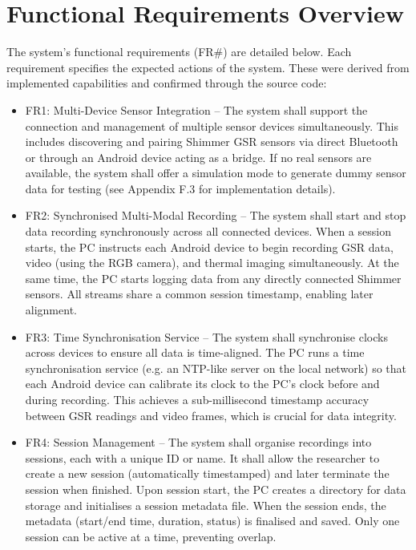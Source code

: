\section{Functional Requirements Overview}
The system's functional requirements (FR\#) are detailed below. Each requirement specifies the expected actions of the system. These were derived from implemented capabilities and confirmed through the source code:

\begin{itemize}
    \item FR1: Multi-Device Sensor Integration -- The system shall support the connection and management of multiple sensor devices simultaneously. This includes discovering and pairing Shimmer GSR sensors via direct Bluetooth or through an Android device acting as a bridge. If no real sensors are available, the system shall offer a simulation mode to generate dummy sensor data for testing (see Appendix F.3 for implementation details).

    \item FR2: Synchronised Multi-Modal Recording -- The system shall start and stop data recording synchronously across all connected devices. When a session starts, the PC instructs each Android device to begin recording GSR data, video (using the RGB camera), and thermal imaging simultaneously. At the same time, the PC starts logging data from any directly connected Shimmer sensors. All streams share a common session timestamp, enabling later alignment.

    \item FR3: Time Synchronisation Service -- The system shall synchronise clocks across devices to ensure all data is time-aligned. The PC runs a time synchronisation service (e.g. an NTP-like server on the local network) so that each Android device can calibrate its clock to the PC's clock before and during recording. This achieves a sub-millisecond timestamp accuracy between GSR readings and video frames, which is crucial for data integrity.

    \item FR4: Session Management -- The system shall organise recordings into sessions, each with a unique ID or name. It shall allow the researcher to create a new session (automatically timestamped) and later terminate the session when finished. Upon session start, the PC creates a directory for data storage and initialises a session metadata file. When the session ends, the metadata (start/end time, duration, status) is finalised and saved. Only one session can be active at a time, preventing overlap.


\end{itemize}
